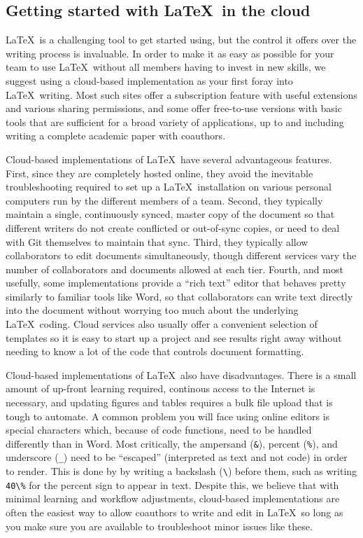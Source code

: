 \subsection{Getting started with \LaTeX\ in the cloud}

\LaTeX\ is a challenging tool to get started using,
but the control it offers over the writing process is invaluable.
In order to make it as easy as possible for your team
to use \LaTeX\ without all members having to invest in new skills,
we suggest using a cloud-based implementation as your first foray into \LaTeX\ writing.
Most such sites offer a subscription feature with useful extensions and various sharing permissions,
and some offer free-to-use versions with basic tools that are sufficient
for a broad variety of applications,
up to and including writing a complete academic paper with coauthors.

Cloud-based implementations of \LaTeX\ have several advantageous features.
First, since they are completely hosted online,
they avoid the inevitable troubleshooting required to set up a \LaTeX\ installation
on various personal computers run by the different members of a team.
Second, they typically maintain a single, continuously synced, master copy of the document
so that different writers do not create conflicted or out-of-sync copies,
or need to deal with Git themselves to maintain that sync.
Third, they typically allow collaborators to edit documents simultaneously,
though different services vary the number of collaborators and documents allowed at each tier.
Fourth, and most usefully, some implementations provide a ``rich text'' editor
that behaves pretty similarly to familiar tools like Word,
so that collaborators can write text directly into the document without worrying too much
about the underlying \LaTeX\ coding.
Cloud services also usually offer a convenient selection of templates
so it is easy to start up a project and see results right away
without needing to know a lot of the code that controls document formatting.

Cloud-based implementations of \LaTeX\ also have disadvantages.
There is a small amount of up-front learning required,
continous access to the Internet is necessary,
and updating figures and tables requires a bulk file upload that is tough to automate.
A common problem you will face using online editors is special characters
which, because of code functions, need to be handled differently than in Word.
Most critically, the ampersand (\texttt{\&}), percent (\texttt{\%}), and underscore (\texttt{\_})
need to be ``escaped'' (interpreted as text and not code) in order to render.
This is done by by writing a backslash (\texttt{\textbackslash}) before them,
such as writing \texttt{40\textbackslash\%} for the percent sign to appear in text.
Despite this, we believe that with minimal learning and workflow adjustments,
cloud-based implementations are often the easiest way to allow coauthors to write and edit in \LaTeX\,
so long as you make sure you are available to troubleshoot minor issues like these.


